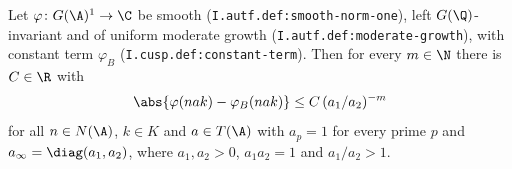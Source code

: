 Let $\varphi\colon G(\A)^1\to\C$ be smooth (\texttt{I.autf.def:smooth-norm-one}), left $G(\Q)$-invariant and of uniform moderate growth
(\texttt{I.autf.def:moderate-growth}), with constant term $\varphi_B$ (\texttt{I.cusp.def:constant-term}). Then for every $m\in\N$ there is $C\in\R$ with
\[
  \abs{\varphi(nak)-\varphi_B(nak)}\le C\,(a_1/a_2)^{-m}
\]
for all $n\in N(\A)$, $k\in K$ and $a\in T(\A)$ with $a_p=1$ for every prime $p$ and $a_\infty=\diag(a_1,a_2)$, where $a_1,a_2>0$, $a_1a_2=1$ and $a_1/a_2>1$.
